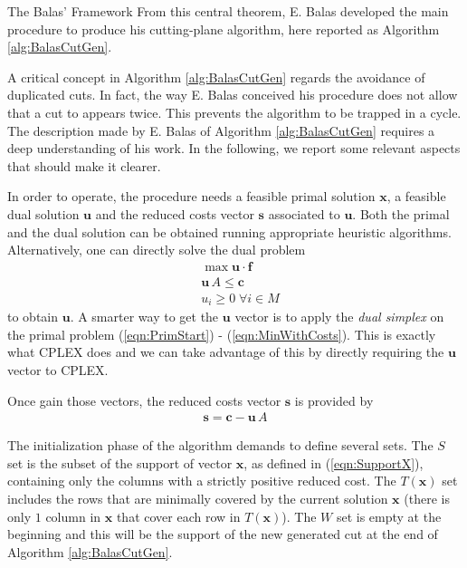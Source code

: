\documentclass[a4paper,12pt]{mydeitesi_eng}
\begin{document}
\begin{chapter}{The Balas' Framework}
From this central theorem, E. Balas developed the main procedure to produce his cutting-plane algorithm, here reported as Algorithm \ref{alg:BalasCutGen}.

A critical concept in Algorithm \ref{alg:BalasCutGen} regards the avoidance of duplicated cuts.
In fact, the way E. Balas conceived his procedure does not allow that a cut to appears twice.
This prevents the algorithm to be trapped in a cycle.\\

The description made by E. Balas of Algorithm \ref{alg:BalasCutGen} requires a deep understanding of his work.
In the following, we report some relevant aspects that should make it clearer.

In order to operate, the procedure needs a feasible primal solution $\mathbf{x}$, a feasible dual solution $\mathbf{u}$ and the reduced costs vector $\mathbf{s}$ associated to $\mathbf{u}$.
Both the primal and the dual solution can be obtained running appropriate heuristic algorithms.
Alternatively, one can directly solve the dual problem
\begin{align}
	& \max \mathbf{u \cdot f} \label{eqn:DualSCP}\\
	& \mathbf{u} \, A \leq \mathbf{c}\\
	& u_i \geq 0 \; \forall i \in M
\end{align}
to obtain $\mathbf{u}$.
A smarter way to get the  $\mathbf{u}$ vector is to apply the \emph{dual simplex} on the primal problem (\ref{eqn:PrimStart}) - (\ref{eqn:MinWithCosts}).
This is exactly what CPLEX does and we can take advantage of this by directly requiring the $\mathbf{u}$ vector to CPLEX.

Once gain those vectors, the reduced costs vector $\mathbf{s}$ is provided by
\begin{align}
\mathbf{s} = \mathbf{c} - \mathbf{u} \, A
\end{align}

The initialization phase of the algorithm demands to define several sets.
The $S$ set is the subset of the support of vector $\mathbf{x}$, as defined in (\ref{eqn:SupportX}), containing only the columns with a strictly positive reduced cost.
The $T(\mathbf{x})$ set includes the rows that are minimally covered by the current solution $\mathbf{x}$ (there is only $1$ column in $\mathbf{x}$ that cover each row in $T(\mathbf{x})$).
The $W$ set is empty at the beginning and this will be the support of the new generated cut at the end of Algorithm \ref{alg:BalasCutGen}.


\end{chapter}
\end{document}
